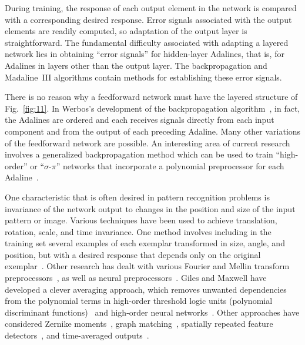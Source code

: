 \documentclass[10pt,twocolumn]{article}
\begin{document}
During training, the response of each output element in the network is compared
with a corresponding desired response. Error signals associated with the output
elements are readily computed, so adaptation of the output layer is
straightforward. The fundamental difficulty associated with adapting a layered
network lies in obtaining ``error signals'' for hidden-layer Adalines, that is,
for Adalines in layers other than the output layer. The backpropagation and
Madaline~III algorithms contain methods for establishing these error signals.

There is no reason why a feedforward network must have the layered structure of
Fig.~\ref{fig:11}. In Werbos's development of the backpropagation
algorithm~\cite{werbos}, in fact, the Adalines are ordered and each receives
signals directly from each input component and from the output of each preceding
Adaline. Many other variations of the feedforward network are possible. An
interesting area of current research involves a generalized backpropagation
method which can be used to train ``high-order'' or ``$\sigma$-$\pi$'' networks
that incorporate a polynomial preprocessor for each Adaline~\cite{pdp,giles88}.

One characteristic that is often desired in pattern recognition problems is
invariance of the network output to changes in the position and size of the
input pattern or image. Various techniques have been used to achieve
translation, rotation, scale, and time invariance. One method involves including
in the training set several examples of each exemplar transformed in size,
angle, and position, but with a desired response that depends only on the
original exemplar~\cite{widrow63}. Other research has dealt with various Fourier
and Mellin transform preprocessors~\cite{casasent,reber}, as well as neural
preprocessors~\cite{widrowwinter}. Giles and Maxwell have developed a clever
averaging approach, which removes unwanted dependencies from the polynomial
terms in high-order threshold logic units (polynomial discriminant
functions)~\cite{giles87} and high-order neural networks~\cite{giles88}. Other
approaches have considered Zernike moments~\cite{khotanzad}, graph
matching~\cite{malsburg88}, spatially repeated feature detectors~\cite{fuku80},
and time-averaged outputs~\cite{waibel}.
\end{document}
